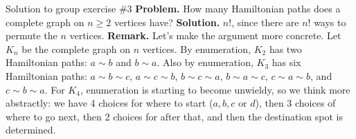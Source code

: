\documentclass[10pt]{beamer}
\begin{document}
\begin{frame}{Solution to group exercise \#3}
\small 
\textbf{Problem.} How many Hamiltonian paths does a complete graph on $n \geq 2$ vertices have?  
\vfill 
\textbf{Solution.} $n!$, since there are $n!$ ways to permute the $n$ vertices. 
\vfill 
\textbf{Remark.} Let's make the argument more concrete.  Let $K_n$ be the complete graph on $n$ vertices.  By enumeration, $K_2$ has two Hamiltonian paths: $a \sim b$ and $b \sim a$. Also by enumeration,  $K_3$ has six Hamiltonian paths: $a \sim b \sim c$, $a \sim c \sim b$,  $b \sim c \sim a$, $b \sim a \sim c$,  $c \sim a \sim b$, and $c \sim b \sim a$. For $K_4$, enumeration is starting to become unwieldy, so we think more abstractly: we have 4 choices for where to start ($a,b,c$ or $d$), then 3 choices of where to go next, then 2 choices for after that, and then the destination spot is determined.


\end{frame}
\end{document}
